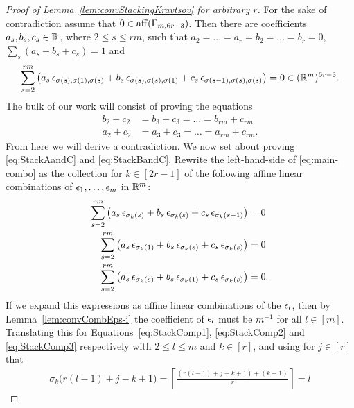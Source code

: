 \begin{proof}[Proof of Lemma~\ref{lem:convStackingKravtsov} for arbitrary $r$]
	For the sake of contradiction assume that $0 \in \operatorname{aff}(\Gamma_{m, 6 r - 3})$. Then there are coefficients $a_s, b_s, c_s \in \mathbb R$, where $2 \leq s \leq r m$, such that $a_2 = \ldots = a_r = b_2 = \ldots = b_r = 0$, $\sum_s (a_s + b_s + c_s) = 1$ and
	\begin{align}
		\sum_{s= 2}^{r m} \left( a_s \, \epsilon_{\sigma(s),\sigma(1),\sigma(s)}
		+ b_s \, \epsilon_{\sigma(s),\sigma(s),\sigma(1)} + c_s \, \epsilon_{\sigma(s-1),\sigma(s),\sigma(s)}  \right) = 0 \in (\mathbb R^m)^{6 r - 3}.\label{eq:main-combo}
	\end{align}
	The bulk of our work will consist of proving the equations
	\begin{align}\label{eq:StackBandC}
		b_2 + c_2 &= b_3 + c_3 = \ldots = b_{r m} + c_{r m}\\
		\label{eq:StackAandC} a_2 + c_2 &= a_3 + c_3 = \ldots = a_{r m} + c_{r m}.
	\end{align}
	From here we will derive a contradiction. We now set about proving \eqref{eq:StackAandC} and \eqref{eq:StackBandC}. Rewrite the left-hand-side of \eqref{eq:main-combo} as the collection for $k \in [2 r - 1]$ of the following affine linear combinations of $\epsilon_1,\ldots,\epsilon_m$ in $\mathbb R^m$:
	\begin{align}
		\sum_{s= 2}^{r m} \left( a_s \, \epsilon_{\sigma_k(s)} 
		+ b_s \, \epsilon_{\sigma_k(s)} + c_s \, \epsilon_{\sigma_k(s-1)}  \right) &= 0 \label{eq:StackComp1}\\
		\sum_{s= 2}^{r m} \left( a_s \, \epsilon_{\sigma_k(1)}
		+ b_s \, \epsilon_{\sigma_k(s)} + c_s \, \epsilon_{\sigma_k(s)}  \right) &= 0 \label{eq:StackComp2} \\
		\sum_{s= 2}^{r m} \left( a_s \, \epsilon_{\sigma_k(s)}
		+ b_s \, \epsilon_{\sigma_k(1)} + c_s \, \epsilon_{\sigma_k(s)}  \right) &= 0. \label{eq:StackComp3}
	\end{align}
	If we expand this expressions as affine linear combinations of the $\epsilon_l$, then by Lemma~\ref{lem:convCombEps-i} the coefficient of $\epsilon_l$ must be $m^{-1}$ for all $l \in [m]$. Translating this for Equations~\eqref{eq:StackComp1}, \eqref{eq:StackComp2} and \eqref{eq:StackComp3} respectively with $2 \leq l \leq m$ and $k \in [r]$, and using for $j \in [r]$ that
	\begin{align}
		\sigma_{k} \big(r(l-1)+j - k + 1 \big) = \left\lceil \frac{(r(l-1)+j - k + 1) + (k-1)}{r} \right\rceil = l \label{eq:sigma-inverse}
	\end{align}

\end{proof}
